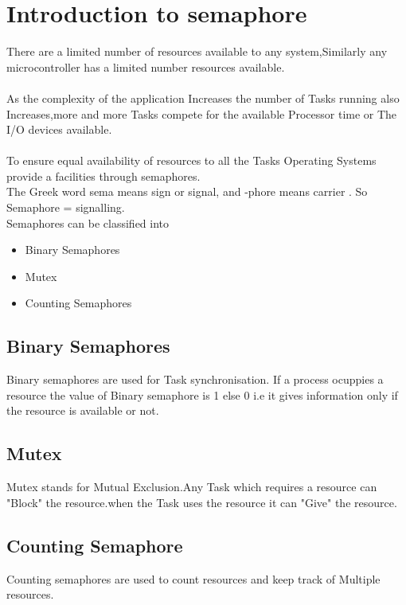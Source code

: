 \documentclass[11pt,a4paper]{article}
\begin{document}
	\section{Introduction to semaphore}
	There are a limited number of resources available to any system,Similarly any microcontroller has a limited number  resources available.
	\\ \\
	As the complexity of the application Increases the number of Tasks running also Increases,more and more Tasks compete for the available Processor time or The I/O devices available.
	\\ \\
	To ensure equal availability of resources to all the Tasks Operating Systems provide a facilities through semaphores.
	\\ 
	The Greek word sema means sign or signal, and -phore means carrier . So Semaphore = signalling.
	\\
	Semaphores can be classified into
	\\ 
	\begin{itemize}
	\item Binary Semaphores
	\item Mutex	 
	\item Counting Semaphores
	
	
	\end{itemize}
	\subsection{Binary Semaphores}
	
	Binary semaphores are used for Task synchronisation.
	If a process ocuppies a resource the value of Binary semaphore is 1 else 0 i.e it gives information only if the resource is available or not.
	
	\subsection{Mutex}
	
	Mutex stands for Mutual Exclusion.Any Task which requires a resource can "Block" the resource.when the Task uses the resource it can "Give" the resource.
	
	\subsection{Counting Semaphore}
	
	Counting semaphores are used to count resources and keep track of Multiple resources.
	\\
	 
\end{document}
